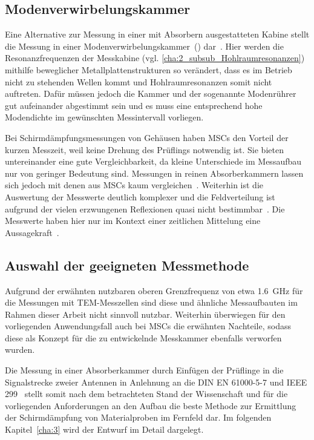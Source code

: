 \subsection{Modenverwirbelungskammer}
Eine Alternative zur Messung in einer mit Absorbern ausgestatteten Kabine stellt die Messung in einer Modenverwirbelungskammer~() dar~\cite{EMV}. Hier werden die Resonanzfrequenzen der Messkabine (vgl. \Abschnitt\ref{cha:2_subsub_Hohlraumresonanzen}) mithilfe beweglicher Metallplattenstrukturen so verändert, dass es im Betrieb nicht zu stehenden Wellen kommt und Hohlraumresonanzen somit nicht auftreten. Dafür müssen jedoch die Kammer und der sogenannte Modenrührer gut aufeinander abgestimmt sein und es muss eine entsprechend hohe Modendichte im gewünschten Messintervall vorliegen. 
\par
\vspace{\linespace}
Bei Schirmdämpfungsmessungen von Gehäusen haben \acp{MSC} den Vorteil der kurzen Messzeit, weil keine Drehung des Prüflings notwendig ist. Sie bieten untereinander eine gute Vergleichbarkeit, da kleine Unterschiede im Messaufbau nur von geringer Bedeutung sind. Messungen in reinen Absorberkammern lassen sich jedoch mit denen aus \acp{MSC} kaum vergleichen~\cite{EMV}. Weiterhin ist die Auswertung der Messwerte deutlich komplexer und die Feldverteilung ist aufgrund der vielen erzwungenen Reflexionen quasi nicht bestimmbar~\cite{EMV}. Die Messwerte haben hier nur im Kontext einer zeitlichen Mittelung eine Aussagekraft~\cite{EMV}.


\subsection{Auswahl der geeigneten Messmethode}

Aufgrund der erwähnten nutzbaren oberen Grenzfrequenz von etwa \SI{1,6}{\giga\hertz} für die Messungen mit TEM-Messzellen sind diese und ähnliche Messaufbauten im Rahmen dieser Arbeit nicht sinnvoll nutzbar. Weiterhin überwiegen für den vorliegenden Anwendungsfall auch bei \acp{MSC} die erwähnten Nachteile, sodass diese als Konzept für die zu entwickelnde Messkammer ebenfalls verworfen wurden. 
\par
\vspace{\linespace}
Die Messung in einer Absorberkammer durch Einfügen der Prüflinge in die Signalstrecke zweier Antennen in Anlehnung an die DIN EN 61000-5-7 und IEEE 299~\cite{DIN_EN_61000-5-7, IEEE_299} stellt somit nach dem betrachteten Stand der Wissenschaft und für die vorliegenden Anforderungen an den Aufbau die beste Methode zur Ermittlung der Schirmdämpfung von Materialproben im Fernfeld dar. Im folgenden Kapitel~\ref{cha:3} wird der Entwurf im Detail dargelegt.











